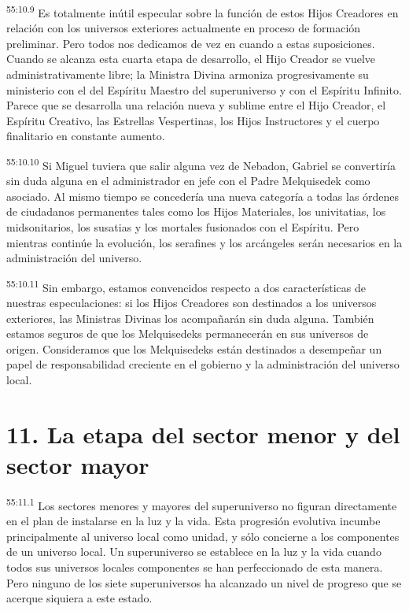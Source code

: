 \par
\textsuperscript{55:10.9} Es totalmente inútil especular sobre la función de estos Hijos Creadores en relación con los universos exteriores actualmente en proceso de formación preliminar. Pero todos nos dedicamos de vez en cuando a estas suposiciones. Cuando se alcanza esta cuarta etapa de desarrollo, el Hijo Creador se vuelve administrativamente libre; la Ministra Divina armoniza progresivamente su ministerio con el del Espíritu Maestro del superuniverso y con el Espíritu Infinito. Parece que se desarrolla una relación nueva y sublime entre el Hijo Creador, el Espíritu Creativo, las Estrellas Vespertinas, los Hijos Instructores y el cuerpo finalitario en constante aumento.

\par
\textsuperscript{55:10.10} Si Miguel tuviera que salir alguna vez de Nebadon, Gabriel se convertiría sin duda alguna en el administrador en jefe con el Padre Melquisedek como asociado. Al mismo tiempo se concedería una nueva categoría a todas las órdenes de ciudadanos permanentes tales como los Hijos Materiales, los univitatias, los midsonitarios, los susatias y los mortales fusionados con el Espíritu. Pero mientras continúe la evolución, los serafines y los arcángeles serán necesarios en la administración del universo.

\par
\textsuperscript{55:10.11} Sin embargo, estamos convencidos respecto a dos características de nuestras especulaciones: si los Hijos Creadores son destinados a los universos exteriores, las Ministras Divinas los acompañarán sin duda alguna. También estamos seguros de que los Melquisedeks permanecerán en sus universos de origen. Consideramos que los Melquisedeks están destinados a desempeñar un papel de responsabilidad creciente en el gobierno y la administración del universo local.

\section*{11. La etapa del sector menor y del sector mayor}
\par
\textsuperscript{55:11.1} Los sectores menores y mayores del superuniverso no figuran directamente en el plan de instalarse en la luz y la vida. Esta progresión evolutiva incumbe principalmente al universo local como unidad, y sólo concierne a los componentes de un universo local. Un superuniverso se establece en la luz y la vida cuando todos sus universos locales componentes se han perfeccionado de esta manera. Pero ninguno de los siete superuniversos ha alcanzado un nivel de progreso que se acerque siquiera a este estado.

